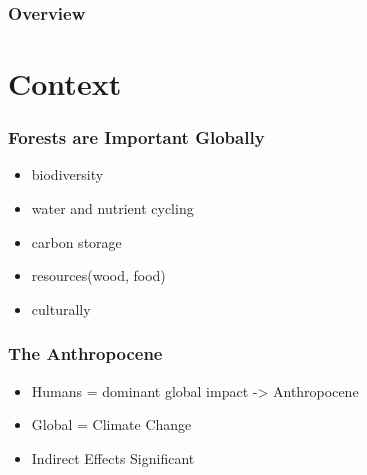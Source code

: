 \begin{frame}
  \titlepage
\end{frame}


\begin{frame}
  \frametitle{Overview}

\tableofcontents


\end{frame}


\section{Context}

\begin{frame}
  \frametitle{Forests are Important Globally}

  \begin{itemize}
  \item biodiversity
  \item water and nutrient cycling
  \item carbon storage
  \item resources(wood, food)
  \item culturally
  \end{itemize}

\end{frame}

\begin{frame}
  \frametitle{The Anthropocene}


  \begin{itemize}
  \item Humans = dominant global impact -> Anthropocene
  \item Global = Climate Change
  \item Indirect Effects Significant
  \end{itemize}


\end{frame}

